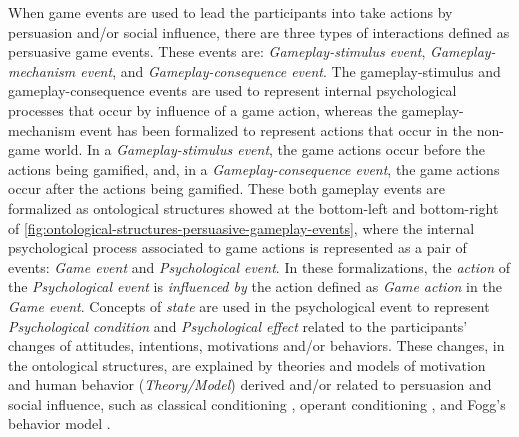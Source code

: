 When game events are used to lead the participants into take actions by persuasion and/or social influence, there are three types of interactions defined as persuasive game events.
These events are: \emph{Gameplay-stimulus event}, \emph{Gameplay-mechanism event}, and \emph{Gameplay-consequence event}.
The gameplay-stimulus and gameplay-consequence events are used to represent internal psychological processes that occur by influence of a game action, whereas the gameplay-mechanism event has been formalized to represent actions that occur in the non-game world.
In a \emph{Gameplay-stimulus event}, the game actions occur before the actions being gamified, and, in a \emph{Gameplay-consequence event}, the game actions occur after the actions being gamified.
These both gameplay events are formalized as ontological structures showed at the bottom-left and bottom-right of \autoref{fig:ontological-structures-persuasive-gameplay-events}, where the internal psychological process associated to game actions is represented as a pair of events: \emph{Game event} and \emph{Psychological event}.
In these formalizations, the \emph{action} of the \emph{Psychological event} is \emph{influenced by} the action defined as \emph{Game action} in the \emph{Game event}.
Concepts of \emph{state} are used in the psychological event to represent \emph{Psychological condition} and \emph{Psychological effect} related to the participants' changes of attitudes, intentions, motivations and/or behaviors.
These changes, in the ontological structures, are explained by theories and models of motivation and human behavior (\emph{Theory/Model}) derived and/or related to persuasion and social influence, such as classical conditioning \cite{GormezanoProkasyThompsonThompson1987}, operant conditioning \cite{Skinner1953}, and Fogg's behavior model \cite{Fogg2009}.

